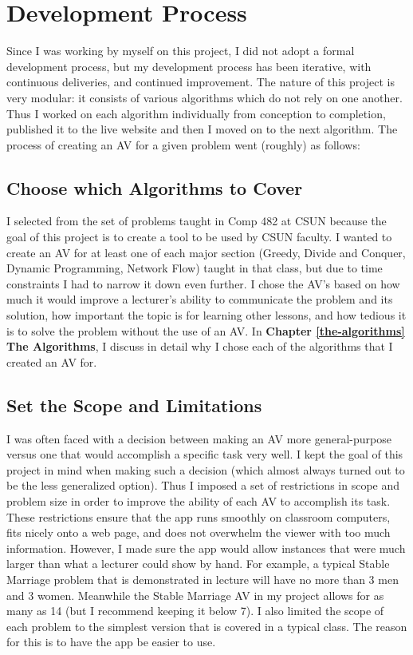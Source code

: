 \chapter{Development Process}
Since I was working by myself on this project, I did not adopt 
a formal development process, 
but my development process has been iterative, with continuous deliveries, 
and continued improvement. The nature of this project is very modular:
it consists of various algorithms which do not rely on one another.
Thus I worked on each algorithm individually 
from conception to completion, published it to the live website 
and then I moved on to the next algorithm. 
The process of creating an AV for a given problem went (roughly) as follows:
\section{Choose which Algorithms to Cover}
\hspace{-0.26in}
I selected from the set of problems taught in Comp 482 at CSUN because
the goal of this project is to create a tool to be used by CSUN faculty.
I wanted to create an AV for at least one of each major section
(Greedy, Divide and Conquer, Dynamic Programming, Network Flow)
taught in that class, but due to time constraints I had to narrow it down even further.
I chose the AV's based on how much it would improve a lecturer's ability to 
communicate the problem and its solution,
how important the topic is for learning other lessons, 
and how tedious it is to solve the problem without the use of an AV. 
In \textbf{Chapter \ref{the-algorithms} The Algorithms}, I discuss in detail why 
I chose each of the algorithms that I created an AV for. 
%
\section{Set the Scope and Limitations}
\hspace{-0.26in}
I was often faced with a decision between making an AV more general-purpose
versus one that would accomplish a specific task very well. 
I kept the goal of this project in mind when making such a decision 
(which almost always turned out to be the less generalized option). 
Thus I imposed a set of restrictions in scope and problem size
in order to improve the ability of each AV to accomplish its task. 
\newline\newline
These restrictions ensure that the app runs smoothly on classroom computers, 
fits nicely onto a web page, 
and does not overwhelm the viewer with too much information. 
However, I made sure the app would allow instances that were much larger than 
what a lecturer could show by hand. 
For example, a typical Stable Marriage problem that is demonstrated in lecture 
will have no more than 3 men and 3 women.
Meanwhile the Stable Marriage AV in my project allows for as many as 14 
(but I recommend keeping it below 7).
\newline\newline
I also limited the scope of each problem to the simplest version that is 
covered in a typical class. The reason for this is to have the app be easier to use. 
%
